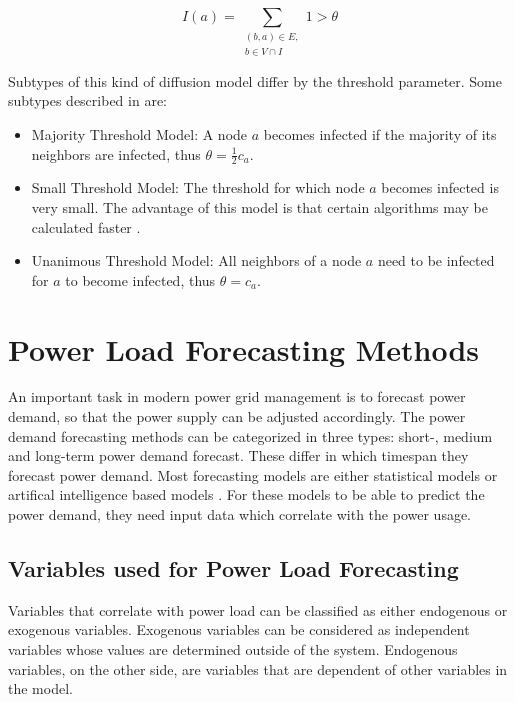 \begin{equation}
    I(a) = \sum\limits_{\substack{(b,a)\in E, \\ b \in V \cap I}}
    1 > \theta    
    \label{eq:threshold}
\end{equation}

Subtypes of this kind of diffusion model differ by the threshold parameter.
Some subtypes described in \cite{diffusionbasics} are:

\begin{itemize}
    \item Majority Threshold Model: A node $a$ becomes
    infected if the majority of its neighbors are infected, thus 
    $\theta = \frac{1}{2}c_a$.
    \item Small Threshold Model: The threshold for which
    node $a$ becomes infected is very small. The advantage of this model is that 
    certain algorithms may be calculated faster \cite{diffusionbasics}.
    \item Unanimous Threshold Model: All neighbors 
    of a node $a$ need to be infected for $a$ to become infected, thus
    $\theta = c_a$.
\end{itemize}


\section{Power Load Forecasting Methods}
\label{powerloadsection}

An important task in modern power grid management 
is to forecast power demand, so that the power supply can be adjusted accordingly.
The power demand forecasting methods can be categorized in three types:
short-, medium and long-term power demand forecast. These differ in which
timespan they forecast power demand. Most forecasting models are 
either statistical models or artifical intelligence based models 
\cite{raza2015review}. For these models to be able to predict the power 
demand, they need input data which correlate with the power 
usage. 

\subsection{Variables used for Power Load Forecasting}
\label{variabledependency}
Variables that correlate with power load 
can be classified as either endogenous or exogenous variables.
Exogenous variables can be considered as independent variables 
whose values are determined outside of the system. 
Endogenous variables, on the other side, 
are variables that are dependent of other variables in the 
model.

